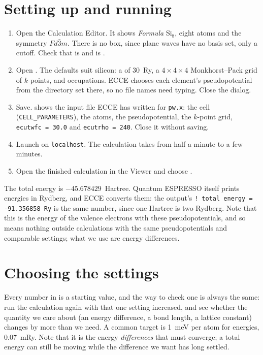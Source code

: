 \section{Setting up and running}
\begin{enumerate}
	\item Open the Calculation Editor. It shows \emph{Formula} Si$_8$, eight atoms and the symmetry $Fd\bar{3}m$. There is no  box, since plane waves have no basis set, only a cutoff. Check that  is  and  is .
	\item Open . The defaults suit silicon: a  of 30~Ry, a $4\times4\times4$ Monkhorst--Pack grid of $k$-points, and  occupations. ECCE chooses each element's pseudopotential from the directory set there, so no file names need typing. Close the dialog.
	\item Save.  shows the input file ECCE has written for \texttt{pw.x}: the cell (\texttt{CELL\_PARAMETERS}), the atoms, the pseudopotential, the $k$-point grid, \texttt{ecutwfc = 30.0} and \texttt{ecutrho = 240}. Close it without saving.
	\item Launch on \texttt{localhost}. The calculation takes from half a minute to a few minutes.
	\item Open the finished calculation in the Viewer and choose .
\end{enumerate}

The total energy is $-45.678429$~Hartree. Quantum ESPRESSO itself prints energies in Rydberg, and ECCE converts them: the output's \texttt{! total energy = -91.356858 Ry} is the same number, since one Hartree is two Rydberg. Note that this is the energy of the valence electrons with these pseudopotentials, and so means nothing outside calculations with the same pseudopotentials and comparable settings; what we use are energy differences.

\section{Choosing the settings}
Every number in  is a starting value, and the way to check one is always the same: run the calculation again with that one setting increased, and see whether the quantity we care about (an energy difference, a bond length, a lattice constant) changes by more than we need. A common target is 1~meV per atom for energies, 0.07~mRy. Note that it is the energy \emph{differences} that must converge; a total energy can still be moving while the difference we want has long settled.

